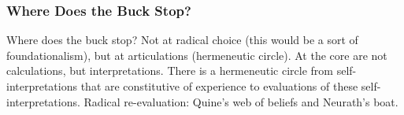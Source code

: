 \documentclass[xcolor=dvipsnames]{beamer}
\begin{document}
\begin{frame}
  \frametitle{Where Does the Buck Stop?}
Where does the buck stop? Not at radical choice (this would be a
sort of foundationalism), but at articulations (hermeneutic
circle). At the core are not calculations, but interpretations.
There is a hermeneutic circle from self-interpretations that are
constitutive of experience to evaluations of these
self-interpretations. Radical re-evaluation: Quine's web of
beliefs and Neurath's boat.  
\end{frame}


\end{document}
